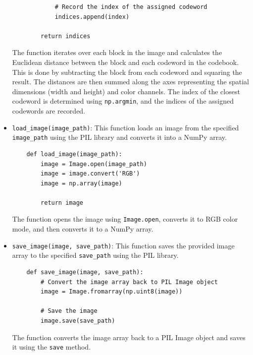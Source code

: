 \documentclass{article}
\begin{document}
\begin{itemize}
\begin{code}
\begin{verbatim}
            # Record the index of the assigned codeword
            indices.append(index)

        return indices
    \end{verbatim}
    \end{code}

    The function iterates over each block in the image and calculates the Euclidean distance between the block and each codeword in the codebook. This is done by subtracting the block from each codeword and squaring the result. The distances are then summed along the axes representing the spatial dimensions (width and height) and color channels. The index of the closest codeword is determined using \texttt{np.argmin}, and the indices of the assigned codewords are recorded.

    \item \texttt{load\_image(image\_path)}: This function loads an image from the specified \texttt{image\_path} using the PIL library and converts it into a NumPy array.

    \begin{code}
    \begin{verbatim}
    def load_image(image_path):
        image = Image.open(image_path)
        image = image.convert('RGB')
        image = np.array(image)

        return image
    \end{verbatim}
    \end{code}

    The function opens the image using \texttt{Image.open}, converts it to RGB color mode, and then converts it to a NumPy array.

    \item \texttt{save\_image(image, save\_path)}: This function saves the provided image array to the specified \texttt{save\_path} using the PIL library.

    \begin{code}
    \begin{verbatim}
    def save_image(image, save_path):
        # Convert the image array back to PIL Image object
        image = Image.fromarray(np.uint8(image))

        # Save the image
        image.save(save_path)
    \end{verbatim}
    \end{code}

    The function converts the image array back to a PIL Image object and saves it using the \texttt{save} method.


\end{itemize}
\end{document}
